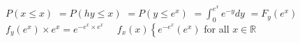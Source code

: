 $P(x \leq x)$
$=P(h y \leq x)$
$=P\left(y \leq e^{x}\right)$
$=\int_{0}^{e^{x}} e^{-y} d y$
$=F_{y}\left(e^{x}\right)$
$f_{y}\left(e^{x}\right) \times e^{x}=e^{-e^{x} \times e^{x}}$
$\quad f_{x}(x)\left\{e^{-e^{x}}\left(e^{x}\right)\right.$ for all $x \in \mathbb{R}$
